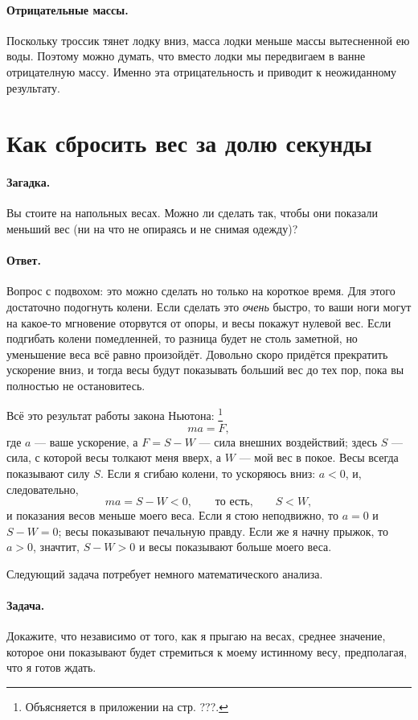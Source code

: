 \paragraph{Отрицательные массы.}
Поскольку троссик тянет лодку вниз, масса лодки меньше массы вытесненной ею воды.
Поэтому можно думать, что вместо лодки мы передвигаем в ванне отрицателную массу.
Именно эта отрицательность и приводит к неожиданному результату.

\section{Как сбросить вес за долю секунды}

\paragraph{Загадка.}
Вы стоите на напольных весах.
Можно ли сделать так, чтобы они показали меньший вес (ни на что не опираясь и не снимая одежду)?

\paragraph{Ответ.} Вопрос с подвохом: это можно сделать но только на короткое время.
Для этого достаточно подогнуть колени.
Если сделать это \emph{очень} быстро, то ваши ноги могут на какое-то мгновение оторвутся от опоры, и весы покажут нулевой вес.
Если подгибать колени помедленней, то разница будет не столь заметной, но уменьшение веса всё равно произойдёт.
Довольно скоро придётся прекратить ускорение вниз, и тогда весы будут показывать больший вес до тех пор, пока вы полностью не остановитесь.

Всё это результат работы закона Ньютона:%
\footnote{Объясняется в приложении на стр. ???.}
\[
ma = F,
\]
где $a$ --- ваше ускорение, а $F=S-W$ --- сила внешних воздействий;
здесь $S$ --- сила, с которой весы толкают меня вверх, а $W$ --- мой вес в покое.
Весы всегда показывают силу $S$.
Если я сгибаю колени, то ускоряюсь вниз: $a<0$, и, следовательно,
\[
ma = S - W < 0,
\qquad\text{то есть,}\qquad
S < W,
\]
и показания весов меньше моего веса.
Если я стою неподвижно, то $a=0$ и $S-W=0$; весы показывают печальную правду.
Если же я начну прыжок, то $a>0$, значтит, $S-W>0$ и весы показывают больше моего веса.

\medskip

Следующий задача потребует немного математического анализа.

\paragraph{Задача.}
Докажите, что независимо от того, как я прыгаю на весах, среднее значение, которое они показывают будет стремиться к моему истинному весу, предполагая, что я готов ждать.


